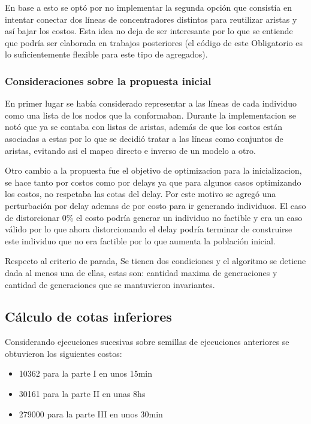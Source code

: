 \documentclass{extarticle}
\begin{document}
En base a esto se optó por no implementar la segunda opción que consistía en intentar conectar dos líneas de concentradores distintos para reutilizar aristas y así bajar los costos. Esta idea no deja de ser interesante por lo que se entiende que podría ser elaborada en trabajos posteriores (el código de este Obligatorio es lo suficientemente flexible para este tipo de agregados).

\subsubsection{Consideraciones sobre la propuesta inicial}
En primer lugar se había considerado representar a las líneas de cada individuo como una lista de los nodos que la conformaban. Durante la implementacion se notó que ya se contaba con listas de aristas, además de que los costos están asociadas a estas por lo que se decidió tratar a las líneas como conjuntos de aristas, evitando asi el mapeo directo e inverso de un modelo a otro.

Otro cambio a la propuesta fue el objetivo de optimizacion para la inicializacion, se hace tanto por costos como por delays ya que para algunos casos optimizando los costos, no respetaba las cotas del delay. Por este motivo se agregó una perturbación por delay ademas de por costo para ir generando individuos. El caso de distorcionar 0\% el costo podría generar un individuo no factible y era un caso válido por lo que ahora distorcionando el delay podría terminar de construirse este individuo que no era factible por lo que aumenta la población inicial.

Respecto al criterio de parada, Se tienen dos condiciones y el algoritmo se detiene dada al menos una de ellas, estas son: cantidad maxima de generaciones y cantidad de generaciones que se mantuvieron invariantes.

\newpage

\subsection{Cálculo de cotas inferiores}
Considerando ejecuciones sucesivas sobre semillas de ejecuciones anteriores se obtuvieron los siguientes costos:
\begin{itemize}
	\item 10362 para la parte I en unos 15min
	\item 30161 para la parte II en unas 8hs
	\item 279000 para la parte III en unos 30min
\end{itemize}
\end{document}
